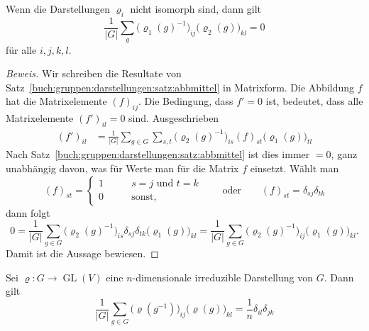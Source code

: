 \begin{satz}
\label{buch:gruppen:darstellungen:satz:matrixnichtiso}
Wenn die Darstellungen $\varrho_i$ nicht isomorph sind, dann gilt
\begin{equation}
\frac{1}{|G|}
\sum_{g} \bigl(\varrho_1(g)^{-1}\bigr)_{i\!j} \bigl(\varrho_2(g)\bigr)_{kl}
=
0
\label{buch:gruppen:darstellungen:eqn:matrixnichtiso}
\end{equation}
für alle $i,j,k,l$.
\end{satz}

\begin{proof}[Beweis]
Wir schreiben die Resultate von
Satz~\ref{buch:gruppen:darstellungen:satz:abbmittel}
in Matrixform.
Die Abbildung $f$ hat die Matrixelemente $(f)_{i\!j}$.
Die Bedingung, dass $f'=0$ ist, bedeutet, dass alle
Matrixelemente $(f')_{il}=0$ sind.
Ausgeschrieben
\begin{align*}
(f')_{il}
&=
\frac{1}{|G|}
\sum_{g\in G}
\sum_{s,t}
\bigl(\varrho_2(g)^{-1}\bigr)_{is} (f)_{st} \bigl(\varrho_1(g)\bigr)_{tl}
\end{align*}
Nach 
Satz~\ref{buch:gruppen:darstellungen:satz:abbmittel}
ist dies immer $=0$, ganz unabhängig davon, was für Werte man für
die Matrix $f$ einsetzt.
Wählt man 
\begin{equation}
(f)_{st}
=
\begin{cases}
1&\qquad\text{$s=j$ und $t=k$}\\
0&\qquad\text{sonst},
\end{cases}
\qquad\text{oder}\qquad
(f)_{st}
=
\delta_{s\!j}\delta_{tk}
\label{buch:gruppen:darstellungen:eqn:fst}
\end{equation}
dann folgt
\[
0
=
\frac{1}{|G|}
\sum_{g\in G} 
\bigl(\varrho_2(g)^{-1}\bigr)_{is}
\delta_{s\!j}
\delta_{tk}
\bigl(\varrho_1(g)\bigr)_{kl}
=
\frac{1}{|G|}
\sum_{g\in G}
\bigl(\varrho_2(g)^{-1}\bigr)_{i\!j}
\bigl(\varrho_1(g)\bigr)_{kl}.
\]
Damit ist die Aussage bewiesen.
\end{proof}

\begin{satz}
\label{buch:gruppen:darstellungen:satz:matrixiso}
Sei $\varrho\colon G\to\operatorname{GL}(V)$ eine $n$-dimensionale
irreduzible Darstellung von $G$.
Dann gilt
\begin{equation}
\frac{1}{|G|}
\sum_{g\in G}
\bigl(\varrho(g^{-1})\bigr)_{i\!j} 
\bigl(\varrho(g))_{kl}
=
\frac1n
\delta_{il}\delta_{jk}
\label{buch:gruppen:darstellungen:eqn:matrixiso}
\end{equation}
\end{satz}

